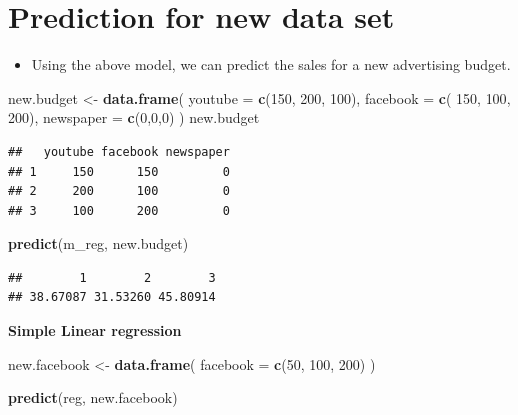 \documentclass[]{book}
\newenvironment{Shaded}{\begin{snugshade}}{\end{snugshade}}
\newcommand{\DataTypeTok}[1]{\textcolor[rgb]{0.13,0.29,0.53}{#1}}
\newcommand{\DecValTok}[1]{\textcolor[rgb]{0.00,0.00,0.81}{#1}}
\newcommand{\KeywordTok}[1]{\textcolor[rgb]{0.13,0.29,0.53}{\textbf{#1}}}
\newcommand{\NormalTok}[1]{#1}
\newcommand{\StringTok}[1]{\textcolor[rgb]{0.31,0.60,0.02}{#1}}
\providecommand{\tightlist}{%
  \setlength{\itemsep}{0pt}\setlength{\parskip}{0pt}}
\begin{document}
\hypertarget{prediction-for-new-data-set}{%
\section{Prediction for new data set}\label{prediction-for-new-data-set}}

\begin{itemize}
\tightlist
\item
  Using the above model, we can predict the sales for a new advertising budget.
\end{itemize}

\begin{Shaded}
\begin{Highlighting}[]
\NormalTok{new.budget <-}\StringTok{ }\KeywordTok{data.frame}\NormalTok{(}
  \DataTypeTok{youtube =} \KeywordTok{c}\NormalTok{(}\DecValTok{150}\NormalTok{, }\DecValTok{200}\NormalTok{, }\DecValTok{100}\NormalTok{),}
  \DataTypeTok{facebook =} \KeywordTok{c}\NormalTok{( }\DecValTok{150}\NormalTok{, }\DecValTok{100}\NormalTok{, }\DecValTok{200}\NormalTok{),}
  \DataTypeTok{newspaper =} \KeywordTok{c}\NormalTok{(}\DecValTok{0}\NormalTok{,}\DecValTok{0}\NormalTok{,}\DecValTok{0}\NormalTok{)}
\NormalTok{)}
\NormalTok{new.budget}
\end{Highlighting}
\end{Shaded}

\begin{verbatim}
##   youtube facebook newspaper
## 1     150      150         0
## 2     200      100         0
## 3     100      200         0
\end{verbatim}

\begin{Shaded}
\begin{Highlighting}[]
\KeywordTok{predict}\NormalTok{(m_reg, new.budget)}
\end{Highlighting}
\end{Shaded}

\begin{verbatim}
##        1        2        3 
## 38.67087 31.53260 45.80914
\end{verbatim}

\textbf{Simple Linear regression}

\begin{Shaded}
\begin{Highlighting}[]
\NormalTok{new.facebook <-}\StringTok{ }\KeywordTok{data.frame}\NormalTok{(}
  \DataTypeTok{facebook =} \KeywordTok{c}\NormalTok{(}\DecValTok{50}\NormalTok{, }\DecValTok{100}\NormalTok{, }\DecValTok{200}\NormalTok{)}
\NormalTok{)}

\KeywordTok{predict}\NormalTok{(reg, new.facebook)}
\end{Highlighting}
\end{Shaded}
\end{document}
